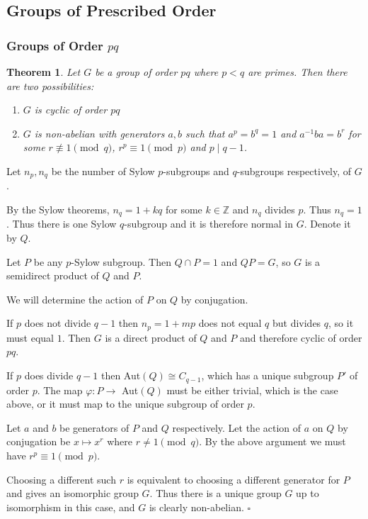 \documentclass[10pt]{article}
\newcommand{\Z}{\mathbb{Z}}
\newtheorem{theorem}{Theorem}[section]
\newenvironment{proof}[1][Proof]{\begin{trivlist}
\item[\hskip \labelsep {\itshape #1}]}{\end{trivlist}}
\begin{document}
\subsection{Groups of Prescribed Order}

\subsubsection{Groups of Order $pq$}

\begin{theorem}
Let $G$ be a group of order $pq$ where $p < q$ are primes. Then there are two possibilities:
\begin{enumerate}
\item $G$ is cyclic of order $pq$
\item $G$ is non-abelian with generators $a, b$ such that $a^p = b^q = 1$ and $a^{-1}ba = b^r$ for some $r \not\equiv 1 \pmod{q}$, $r^p \equiv 1 \pmod{p}$ and $p \;|\; q - 1$.
\end{enumerate}
\end{theorem}

\begin{proof}
Let $n_p, n_q$ be the number of Sylow $p$-subgroups and $q$-subgroups respectively, of $G$.

By the Sylow theorems, $n_q = 1 + kq$ for some $k \in \Z$ and $n_q$ divides $p$. Thus $n_q = 1$. Thus there is one Sylow $q$-subgroup and it is therefore normal in $G$. Denote it by $Q$.

Let $P$ be any $p$-Sylow subgroup. Then $Q\cap P = 1$ and $QP = G$, so $G$ is a semidirect product of $Q$ and $P$.

We will determine the action of $P$ on $Q$ by conjugation.

If $p$ does not divide $q - 1$ then $n_p = 1 + mp$ does not equal $q$ but divides $q$, so it must equal $1$. Then $G$ is a direct product of $Q$ and $P$ and therefore cyclic of order $pq$.

If $p$ does divide $q - 1$ then Aut$(Q) \cong C_{q-1}$, which has a unique subgroup $P'$ of order $p$. The map $\varphi : P \to$ Aut$(Q)$ must be either trivial, which is the case above, or it must map to the unique subgroup of order $p$.

Let $a$ and $b$ be generators of $P$ and $Q$ respectively. Let the action of $a$ on $Q$ by conjugation be $x \mapsto x^r$ where $r \neq 1 \pmod{q}$. By the above argument we must have $r^p \equiv 1 \pmod{p}$.

Choosing a different such $r$ is equivalent to choosing a different generator for $P$ and gives an isomorphic group $G$. Thus there is a unique group $G$ up to isomorphism in this case, and $G$ is clearly non-abelian. $\square$
\end{proof}
\end{document}

